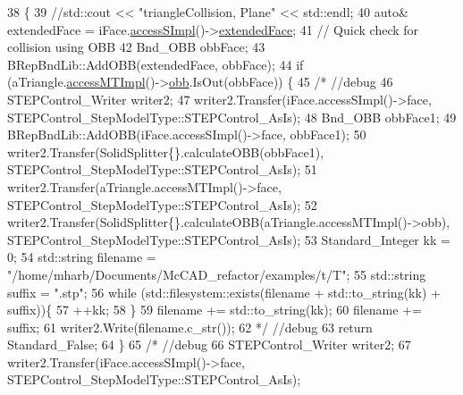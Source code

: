\begin{DoxyCode}
38                                      \{
39     \textcolor{comment}{//std::cout << "triangleCollision, Plane" << std::endl;}
40     \textcolor{keyword}{auto}& extendedFace = iFace.\hyperlink{classMcCAD_1_1Geometry_1_1Surface_a989de1f9ebe3de043412014ed25e52eb}{accessSImpl}()->\hyperlink{classMcCAD_1_1Geometry_1_1Surface_1_1Impl_afaca81a1a3f54b93988737ac7085a0f2}{extendedFace};
41     \textcolor{comment}{// Quick check for collision using OBB}
42     Bnd\_OBB obbFace;
43     BRepBndLib::AddOBB(extendedFace, obbFace);
44     \textcolor{keywordflow}{if} (aTriangle.\hyperlink{classMcCAD_1_1Geometry_1_1MeshTriangle_abd8b4e7b4f1dc5da17651c741bc6fada}{accessMTImpl}()->\hyperlink{classMcCAD_1_1Geometry_1_1MeshTriangle_1_1Impl_a1b7bcf68b5df6bca6d87f674eb048a4d}{obb}.IsOut(obbFace)) \{
45         \textcolor{comment}{/* //debug}
46 \textcolor{comment}{        STEPControl\_Writer writer2;}
47 \textcolor{comment}{        writer2.Transfer(iFace.accessSImpl()->face, STEPControl\_StepModelType::STEPControl\_AsIs);}
48 \textcolor{comment}{        Bnd\_OBB obbFace1;}
49 \textcolor{comment}{        BRepBndLib::AddOBB(iFace.accessSImpl()->face, obbFace1);}
50 \textcolor{comment}{        writer2.Transfer(SolidSplitter\{\}.calculateOBB(obbFace1),
       STEPControl\_StepModelType::STEPControl\_AsIs);}
51 \textcolor{comment}{        writer2.Transfer(aTriangle.accessMTImpl()->face, STEPControl\_StepModelType::STEPControl\_AsIs);}
52 \textcolor{comment}{        writer2.Transfer(SolidSplitter\{\}.calculateOBB(aTriangle.accessMTImpl()->obb),
       STEPControl\_StepModelType::STEPControl\_AsIs);}
53 \textcolor{comment}{        Standard\_Integer kk = 0;}
54 \textcolor{comment}{        std::string filename = "/home/mharb/Documents/McCAD\_refactor/examples/t/T";}
55 \textcolor{comment}{        std::string suffix = ".stp";}
56 \textcolor{comment}{        while (std::filesystem::exists(filename + std::to\_string(kk) + suffix))\{}
57 \textcolor{comment}{            ++kk;}
58 \textcolor{comment}{        \}}
59 \textcolor{comment}{        filename += std::to\_string(kk);}
60 \textcolor{comment}{        filename += suffix;}
61 \textcolor{comment}{        writer2.Write(filename.c\_str());}
62 \textcolor{comment}{        */} \textcolor{comment}{//debug}
63         \textcolor{keywordflow}{return} Standard\_False;
64     \}
65     \textcolor{comment}{/* //debug}
66 \textcolor{comment}{    STEPControl\_Writer writer2;}
67 \textcolor{comment}{    writer2.Transfer(iFace.accessSImpl()->face, STEPControl\_StepModelType::STEPControl\_AsIs);}

\end{DoxyCode}
